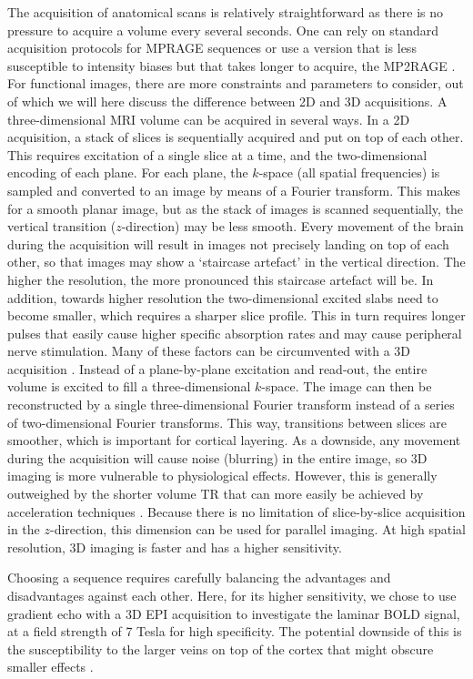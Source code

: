 The acquisition of anatomical scans is relatively straightforward as there is no pressure to acquire a volume every several seconds. One can rely on standard acquisition protocols for MPRAGE sequences \cite{Mugler1990} or use a version that is less susceptible to intensity biases but that takes longer to acquire, the MP2RAGE \cite{Marques2010}. For functional images, there are more constraints and parameters to consider, out of which we will here discuss the difference between 2D and 3D acquisitions. A three-dimensional MRI volume can be acquired in several ways. In a 2D acquisition, a stack of slices is sequentially acquired and put on top of each other. This requires excitation of a single slice at a time, and the two-dimensional encoding of each plane. For each plane, the $k$-space (all spatial frequencies) is sampled and converted to an image by means of a Fourier transform. This makes for a smooth planar image, but as the stack of images is scanned sequentially, the vertical transition ($z$-direction) may be less smooth. Every movement of the brain during the acquisition will result in images not precisely landing on top of each other, so that images may show a `staircase artefact' in the vertical direction. The higher the resolution, the more pronounced this staircase artefact will be. In addition, towards higher resolution the two-dimensional excited slabs need to become smaller, which requires a sharper slice profile. This in turn requires longer pulses that easily cause higher specific absorption rates and may cause peripheral nerve stimulation. Many of these factors can be circumvented with a 3D acquisition \cite{Poser2010}. Instead of a plane-by-plane excitation and read-out, the entire volume is excited \cite{Song1994} to fill a three-dimensional $k$-space. The image can then be reconstructed by a single three-dimensional Fourier transform instead of a series of two-dimensional Fourier transforms. This way, transitions between slices are smoother, which is important for cortical layering. As a downside, any movement during the acquisition will cause noise (blurring) in the entire image, so 3D imaging is more vulnerable to physiological effects. However, this is generally outweighed by the shorter volume TR that can more easily be achieved by acceleration techniques \cite{Poser2010}. Because there is no limitation of slice-by-slice acquisition in the $z$-direction, this dimension can be used for parallel imaging. At high spatial resolution, 3D imaging is faster and has a higher sensitivity.

Choosing a sequence requires carefully balancing the advantages and disadvantages against each other. Here, for its higher sensitivity, we chose to use gradient echo with a 3D EPI acquisition to investigate the laminar BOLD signal, at a field strength of 7 Tesla for high specificity. The potential downside of this is the susceptibility to the larger veins on top of the cortex that might obscure smaller effects \cite{Barth2007}.

